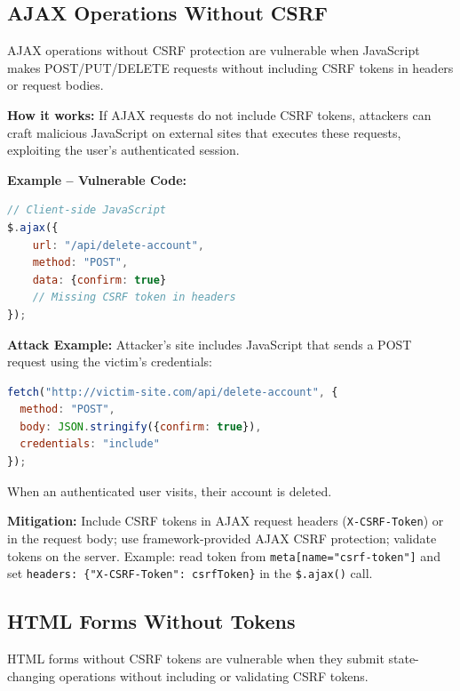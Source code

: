 \subsection{AJAX Operations Without CSRF}
\label{sec:csrf_ajax}

AJAX operations without CSRF protection are vulnerable when JavaScript makes POST/PUT/DELETE requests without including CSRF tokens in headers or request bodies.

\textbf{How it works:} If AJAX requests do not include CSRF tokens, attackers can craft malicious JavaScript on external sites that executes these requests, exploiting the user's authenticated session.

\textbf{Example -- Vulnerable Code:}

\begin{lstlisting}[language=JavaScript, basicstyle=\ttfamily\small, keywordstyle=\color{blue}, frame=single, breaklines=true, breakatwhitespace=false]
// Client-side JavaScript
$.ajax({
    url: "/api/delete-account",
    method: "POST",
    data: {confirm: true}
    // Missing CSRF token in headers
});
\end{lstlisting}

\textbf{Attack Example:} Attacker's site includes JavaScript that sends a POST request using the victim's credentials:
\begin{lstlisting}[language=JavaScript, basicstyle=\ttfamily\small, keywordstyle=\color{blue}, frame=single, breaklines=true, breakatwhitespace=false]
fetch("http://victim-site.com/api/delete-account", {
  method: "POST",
  body: JSON.stringify({confirm: true}),
  credentials: "include"
});
\end{lstlisting}
When an authenticated user visits, their account is deleted.

\textbf{Mitigation:} Include CSRF tokens in AJAX request headers (\texttt{X-CSRF-Token}) or in the request body; use framework-provided AJAX CSRF protection; validate tokens on the server. Example: read token from \texttt{meta[name="csrf-token"]} and set \texttt{headers: \{"X-CSRF-Token": csrfToken\}} in the \texttt{\$.ajax()} call.

\subsection{HTML Forms Without Tokens}
\label{sec:csrf_html_forms}

HTML forms without CSRF tokens are vulnerable when they submit state-changing operations without including or validating CSRF tokens.

